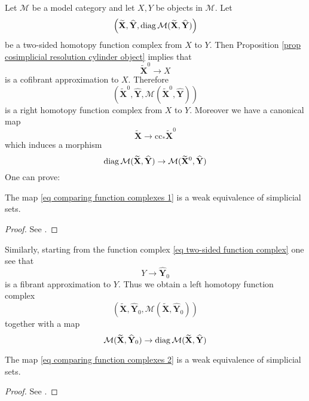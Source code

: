 Let $\mathcal M$ be a model category and let $X,Y$ be objects in $\mathcal M$. Let
\begin{equation} \label{eq two-sided function complex}
\left( \widetilde{\mathbf X}, \widehat{\mathbf Y}, \mathrm{diag} \, \mathcal M ( \widetilde{\mathbf X}, \widehat{\mathbf Y}) \right)
\end{equation}
be a two-sided homotopy function complex from $X$ to $Y$. Then Proposition \ref{prop cosimplicial resolution cylinder object} implies that
\[
\widetilde{\mathbf X}^0 \to X
\]
is a cofibrant approximation to $X$. Therefore
\[
\left(\widetilde{\mathbf X}^0, \widehat{\mathbf Y}, \mathcal M( \widetilde{\mathbf X}^0, \widehat{\mathbf Y}) \right)
\]
is a right homotopy function complex from $X$ to $Y$. Moreover we have a canonical map
\[
\widetilde{\mathbf X} \to \mathrm{cc}_* \widetilde{\mathbf X}^0
\]
which induces a morphism
\begin{equation} \label{eq comparing function complexes 1}
\mathrm{diag} \, \mathcal M (\widetilde{\mathbf X}, \widehat{\mathbf Y}) \to \mathcal M(\widetilde{\mathbf X}^0, \widehat{\mathbf Y})
\end{equation}
One can prove:

\begin{thm}
The map \eqref{eq comparing function complexes 1} is a weak equivalence of simplicial sets.
\end{thm}

\begin{proof}
See \cite[Proposition 17.4.6]{hirschhorn}.
\end{proof}

Similarly, starting from the function complex \eqref{eq two-sided function complex} one see that
\[
Y \to \widehat{\mathbf Y}_0
\]
is a fibrant approximation to $Y$. Thus we obtain a left homotopy function complex
\[
\left( \widetilde{\mathbf X}, \widehat{\mathbf Y}_0, \mathcal M( \widetilde{\mathbf X}, \widehat{\mathbf Y}_0) \right)
\]
together with a map
\begin{equation} \label{eq comparing function complexes 2}
\mathcal M( \widetilde{\mathbf X}, \widehat{\mathbf Y}_0) \to \mathrm{diag} \, \mathcal M(\widetilde{\mathbf X}, \widehat{\mathbf Y})
\end{equation}

\begin{thm}
The map \eqref{eq comparing function complexes 2} is a weak equivalence of simplicial sets.
\end{thm}

\begin{proof}
See \cite[Proposition 17.4.6]{hirschhorn}.
\end{proof}

